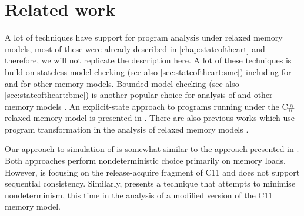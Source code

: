 \section{Related work}

A lot of techniques have support for program analysis under relaxed memory models, most of these were already described in \autoref{chap:stateoftheart} and therefore, we will not replicate the description here.
A lot of these techniques is build on stateless model checking (see also \autoref{sec:stateoftheart:smc}) including  for \xtso and  for other memory models. Bounded model checking (see also \autoref{sec:stateoftheart:bmc}) is another popular choice for analysis of \xtso {} and other memory models .
An explicit-state approach to programs running under the C\# relaxed memory model is presented in .
There are also previous works which use program transformation in the analysis of relaxed memory models .

Our approach to simulation of \xtso is somewhat similar to the approach presented in . Both approaches perform nondeterministic choice primarily on memory loads. However, \cite{Abdulla2018} is focusing on the release-acquire fragment of C11 and does not support sequential consistency.
Similarly,  presents a technique that attempts to minimise nondeterminism, this time in the analysis of a modified version of the C11 memory model.

